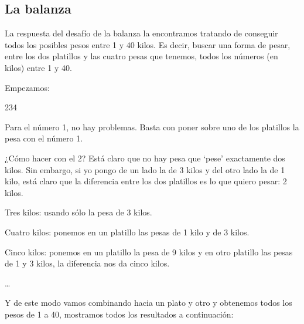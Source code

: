 \subsection*{La balanza}
La respuesta del desafío de la balanza la encontramos tratando de conseguir todos los posibles pesos entre 1 y 40 kilos. Es
decir, buscar una forma de pesar, entre los dos platillos y las cuatro pesas que tenemos, todos los números (en kilos) entre 1 y 40.

Empezamos:
\begin{dinglist}{234}
\item Para el número 1, no hay problemas. Basta con poner sobre uno de los platillos la pesa con el número 1.
\item ¿Cómo hacer con el 2? Está claro que no hay pesa que ‘pese’
exactamente dos kilos. Sin embargo, si yo pongo de un lado
la de 3 kilos y del otro lado la de 1 kilo, está claro que la diferencia entre los dos platillos es lo que quiero pesar: 2 kilos.
\item Tres kilos: usando sólo la pesa de 3 kilos.
\item Cuatro kilos: ponemos en un platillo las pesas de 1 kilo y de 3 kilos.
\item Cinco kilos: ponemos en un platillo la pesa de 9 kilos y en otro platillo las pesas de 1 y 3 kilos, la diferencia nos da cinco kilos.
\item \dots
\end{dinglist}
Y de este modo vamos combinando hacia un plato y otro y obtenemos todos los pesos de 1 a 40, mostramos todos los resultados a continuación:
